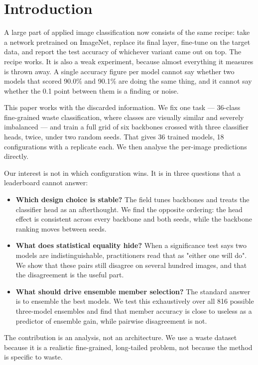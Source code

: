 \documentclass[runningheads]{llncs}
\begin{document}
\section{Introduction}

A large part of applied image classification now consists of the same recipe:
take a network pretrained on ImageNet, replace its final layer, fine-tune on
the target data, and report the test accuracy of whichever variant came out on
top. The recipe works. It is also a weak experiment, because almost everything
it measures is thrown away. A single accuracy figure per model cannot say
whether two models that scored 90.0\% and 90.1\% are doing the same thing, and
it cannot say whether the 0.1 point between them is a finding or noise.

This paper works with the discarded information. We fix one task --- 36-class
fine-grained waste classification, where classes are visually similar and
severely imbalanced --- and train a full grid of six backbones crossed with
three classifier heads, twice, under two random seeds. That gives 36 trained
models, 18 configurations with a replicate each. We then analyse the per-image
predictions directly.

Our interest is not in which configuration wins. It is in three questions that
a leaderboard cannot answer:

\begin{itemize}
\item \textbf{Which design choice is stable?} The field tunes backbones and
treats the classifier head as an afterthought. We find the opposite ordering:
the head effect is consistent across every backbone and both seeds, while the
backbone ranking moves between seeds.
\item \textbf{What does statistical equality hide?} When a significance test
says two models are indistinguishable, practitioners read that as "either one
will do". We show that these pairs still disagree on several hundred images,
and that the disagreement is the useful part.
\item \textbf{What should drive ensemble member selection?} The standard answer
is to ensemble the best models. We test this exhaustively over all 816 possible
three-model ensembles and find that member accuracy is close to useless as a
predictor of ensemble gain, while pairwise disagreement is not.
\end{itemize}

The contribution is an analysis, not an architecture. We use a waste dataset
because it is a realistic fine-grained, long-tailed problem, not because the
method is specific to waste.
\end{document}
